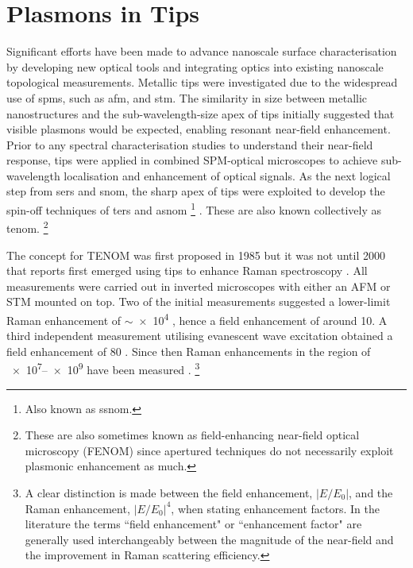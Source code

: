 \documentclass{article}
\begin{document}
\section{Plasmons in Tips}
\label{sec:tip_literature}

Significant efforts have been made to advance nanoscale surface characterisation by developing new optical tools and integrating optics into existing nanoscale topological measurements. Metallic tips were  investigated due to the widespread use of \glspl{spm}, such as \gls{afm}, and \gls{stm}. The similarity in size between metallic nanostructures and the sub-wavelength-size apex of tips initially suggested that visible plasmons would be expected, enabling resonant near-field enhancement. Prior to any spectral characterisation studies to understand their near-field response, tips were applied in combined SPM-optical microscopes to achieve sub-wavelength localisation and enhancement of optical signals. As the next logical step from \gls{sers} and \gls{snom}, the sharp apex of tips were exploited to develop the spin-off techniques of \gls{ters} \cite{stockle2000, anderson2000, hayazawa2000, pettinger2000} and \gls{asnom}%
\footnote{Also known as \gls{ssnom}.}
\cite{zenhausern1994, zenhausern1995, bachelot1995, knoll1997, knoll1998, keilmann1999}.
These are also known collectively as \gls{tenom}.%
\footnote{These are also sometimes known as field-enhancing near-field optical microscopy (FENOM) since apertured techniques do not necessarily exploit plasmonic enhancement as much.}

The concept for TENOM was first proposed in 1985 \cite{wessel1985} but it was not until 2000 that reports first emerged using tips to enhance Raman spectroscopy \cite{stockle2000, anderson2000, hayazawa2000, pettinger2000}. All measurements were carried out in inverted microscopes with either an AFM \cite{stockle2000, anderson2000, hayazawa2000} or STM \cite{pettinger2000} mounted on top. Two of the initial measurements suggested a lower-limit Raman enhancement of $\sim$\num{e4} \cite{stockle2000, anderson2000}, hence a field enhancement of around 10. A third independent measurement utilising evanescent wave excitation obtained a field enhancement of 80 \cite{hayazawa2000}. Since then Raman enhancements in the region of \num{e7}--\num{e9} have been measured \cite{pettinger2012}.%
\footnote{A clear distinction is made between the field enhancement, $|E/E_0|$, and the Raman enhancement, $|E/E_0|^4$, when stating enhancement factors. In the literature the terms ``field enhancement" or ``enhancement factor" are generally used interchangeably between the magnitude of the near-field and the improvement in Raman scattering efficiency.}
\end{document}
